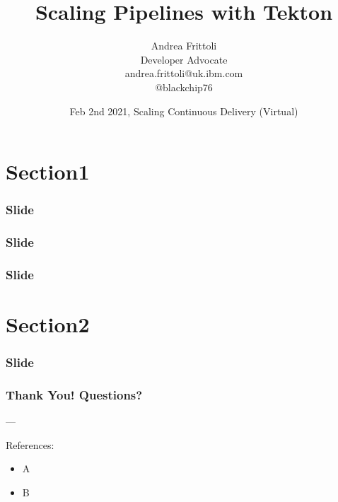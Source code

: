 \documentclass[aspectratio=169,11pt,hyperref={colorlinks=true}]{beamer}
\title{Scaling Pipelines with Tekton}
\date[Scaling Continuous Delivery]{Feb 2nd 2021, Scaling Continuous Delivery (Virtual)}
\author[Andrea]{
  Andrea Frittoli \\
  Developer Advocate \\
  andrea.frittoli@uk.ibm.com \\
  @blackchip76
}
\begin{document}
\begin{frame}[noframenumbering]
\titlepage{}
\end{frame}

\section{Section1}

\begin{lgrayrwhiteframe}
  \frametitle{Slide}
\end{lgrayrwhiteframe}

\begin{lblackrwhiteframe}
  \frametitle{Slide}
\end{lblackrwhiteframe}

\begin{blackframe}
  \frametitle{Slide}
\end{blackframe}

\section{Section2}

\begin{tblackbgrayframe}
  \frametitle{Slide}
  \setlststyle
\end{tblackbgrayframe}


\begin{blackframe}
  \frametitle{Thank You! Questions?}
  \vspace{30pt}
  \footnotesize\insertauthor\par---\par%
  \vspace{10ex}
  References:
  \begin{itemize}
    \item A
    \item B
  \end{itemize}
\end{blackframe}
\end{document}
